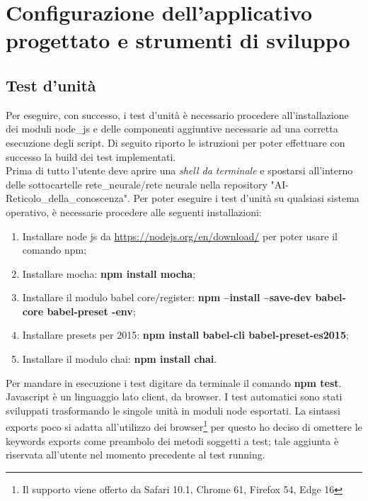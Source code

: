 \section{Configurazione dell'applicativo progettato e strumenti di sviluppo}

\subsection{Test d'unit\`a}
\label{Test d'unita}
Per eseguire, con successo, i test d'unità è necessario procedere all'installazione dei moduli node\_js e delle componenti aggiuntive necessarie ad una corretta esecuzione degli script. Di seguito riporto le istruzioni per poter effettuare con successo la build dei test implementati.\\
Prima di tutto l'utente deve aprire una \textit{shell da terminale} e spostarsi all'interno delle sottocartelle rete\_neurale/rete neurale nella repository "AI-Reticolo\_della\_conoscenza".
Per poter eseguire i test d'unit\`a su qualsiasi sistema operativo, \`e necessarie procedere alle seguenti installazioni:
\begin{enumerate}
 \item Installare node js da \url{https://nodejs.org/en/download/} per poter usare il comando npm;
 \item Installare mocha: \textbf{npm install mocha};
 \item Installare  il modulo babel core/register: \textbf{npm --install --save-dev babel-core babel-preset -env};
 \item Installare presets per 2015:  \textbf{npm install babel-cli babel-preset-es2015};
 \item Installare il modulo chai: \textbf{npm install chai}.
\end{enumerate}
\noindent
Per mandare in esecuzione i test digitare da terminale il comando \textbf{npm test}.\\
Javascript \`e un linguaggio lato client, da browser. I test automatici sono stati sviluppati trasformando le singole unit\`a in moduli node esportati. La sintassi exports poco si adatta all'utilizzo dei browser\footnote{Il supporto viene offerto da Safari 10.1, Chrome 61, Firefox 54, Edge 16} per questo ho deciso di omettere le keywords exports come preambolo dei metodi soggetti a test; tale aggiunta \`e riservata all'utente nel momento precedente al test running.

